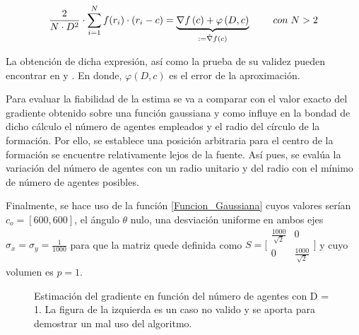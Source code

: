 \begin{equation}\label{Fun_Esti}
	\frac{2}{N\cdot{D}^2}\cdot\sum_{i=1}^{N}f(r_{i})\cdot(r_{i}-c)=\underbrace{\nabla{f}\left(c\right) + \varphi\left(D,c\right)}_{:=\hat{\nabla}{f}\left(c\right)}\hspace{8mm}con\hspace{1mm}{N>2}
\end{equation}

La obtención de dicha expresión, así como la prueba de su validez pueden encontrar en \cite{Estimacion_Gradiente} y \cite{Adicional_Estimacion_1}. En donde, $\varphi\left(D,c\right)$ es el error de la aproximación.

Para evaluar la fiabilidad de la estima se va a comparar con el valor exacto del gradiente obtenido sobre una función gaussiana y como influye en la bondad de dicho cálculo el número de agentes empleados y el radio del círculo de la formación. Por ello, se establece una posición arbitraria para el centro de la formación  se encuentre relativamente lejos de la fuente. Así pues, se evalúa la variación del número de agentes con un radio unitario y del radio con el mínimo de número de agentes posibles.

Finalmente, se hace uso de la función \ref{Funcion_Gaussiana} cuyos valores serían $c_{o}=[600,600]$, el ángulo $\theta$ nulo, una desviación uniforme en ambos ejes $\sigma_{x}=\sigma_{y}=\frac{1}{1000}$ para que la matriz quede definida como $S = \bigl[\begin{smallmatrix}\frac{1000}{\sqrt{2}} & 0\\ 0 & \frac{1000}{\sqrt{2}}\end{smallmatrix}\bigr]$  y cuyo volumen es $p = 1$. 

\begin{figure}[H]
  \begin{center}
    \caption{Estimación del gradiente en función del número de agentes con D = 1. La figura de la izquierda es un caso no valido y se aporta para demostrar un mal uso del algoritmo.}
    \label{NAGENTSEST}
  \end{center}
\end{figure}


